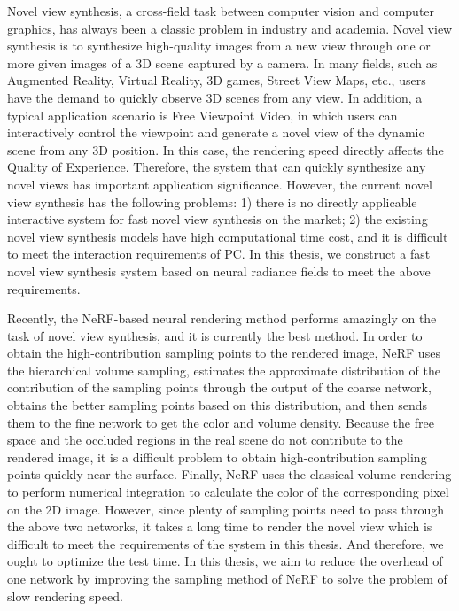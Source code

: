 \begin{abstract*}
Novel view synthesis, a cross-field task between computer vision and computer graphics, has always been a classic problem in  industry and academia. Novel view synthesis is to synthesize high-quality images from a new view through one or more given images of a 3D scene captured by a camera. In many fields, such as Augmented Reality, Virtual Reality, 3D games, Street View Maps, etc., users have the demand to quickly observe 3D scenes from any view. In addition, a typical application scenario is Free Viewpoint Video, in which users can interactively control the viewpoint and generate a novel view of the dynamic scene from any 3D position. In this case, the rendering speed directly affects the Quality of Experience. Therefore, the system that can quickly synthesize any novel views has important application significance. However, the current novel view synthesis has the following problems: 1) there is no directly applicable interactive system for fast novel view synthesis on the market; 2) the existing novel view synthesis models have high computational time cost, and it is difficult to meet the interaction requirements of PC. In this thesis, we construct a fast novel view synthesis system based on neural radiance fields to meet the above requirements.

Recently, the NeRF-based neural rendering method performs amazingly on the task of novel view synthesis, and it is currently the best method.  
In order to obtain the high-contribution sampling points to the rendered image, NeRF uses the hierarchical volume sampling, estimates the approximate distribution of the contribution of the sampling points through the output of the coarse network, obtains the better sampling points based on this distribution, and then sends them to the fine network to get the color and volume density. 
Because the free space and the occluded regions in the real scene do not contribute to the rendered image, it is a difficult problem to obtain high-contribution sampling points quickly near the surface.
Finally, NeRF uses the classical volume rendering to perform numerical integration to calculate the color of the corresponding pixel on the 2D image. However, since plenty of sampling points need to pass through the above two networks, it takes a long time to render the novel view which is difficult to meet the requirements of the system in this thesis. And therefore, we ought to optimize the test time. In this thesis, we aim to reduce the overhead of one network by improving the sampling method of NeRF to solve the problem of slow rendering speed.


\end{abstract*}
